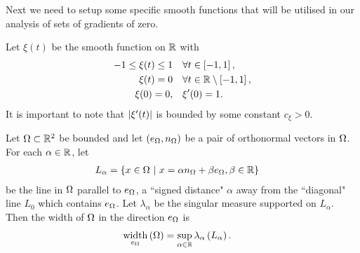 \documentclass[11pt]{report}
\DeclareMathOperator*{\dw}{width}
\newcommand{\dirWidth}[2]{\dw_{#2}\bracs{#1}}
\begin{document}
Next we need to setup some specific smooth functions that will be utilised in our analysis of sets of gradients of zero.
\begin{definition} \label{def:xiFuncDef}
	Let $\xi(t)$ be the smooth function on $\mathbb{R}$ with
	\begin{align*}
		-1 \leq \xi(t) \leq 1 &\quad \forall t\in\left[ -1,1 \right], \\
		\xi(t) = 0 &\quad \forall t\in\mathbb{R}\setminus\left[ -1,1 \right], \\
		\xi(0) = 0, &\quad \xi'(0) = 1.
	\end{align*}
	It is important to note that $\left\lvert \xi'(t) \right\rvert$ is bounded by some constant $c_{\xi}>0$.
\end{definition}

\begin{definition}
	Let $\Omega\subset\mathbb{R}^2$ be bounded and let $\left( e_\Omega, n_\Omega \right)$ be a pair of orthonormal vectors in $\Omega$.
	For each $\alpha\in\mathbb{R}$, let
	\begin{align*}
		L_\alpha &= \left\{ x\in\Omega \ \vert \ x=\alpha n_\Omega + \beta e_\Omega, \beta\in\mathbb{R} \right\}
	\end{align*}
	be the line in $\Omega$ parallel to $e_\Omega$, a ``signed distance" $\alpha$ away from the ``diagonal" line $L_0$ which contains $e_\Omega$.
	Let $\lambda_\alpha$ be the singular measure supported on $L_\alpha$.
	Then the width of $\Omega$ in the direction $e_\Omega$ is
	\begin{align*}
		\dirWidth{\ddom}{e_\ddom} &= \sup_{\alpha\in\reals} \lambda_\alpha\bracs{L_\alpha}.
	\end{align*}
\end{definition}
\end{document}

